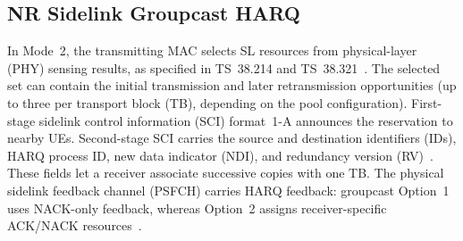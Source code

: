 \documentclass[conference]{IEEEtran}
\begin{document}
\subsection{NR Sidelink Groupcast HARQ}
In Mode~2, the transmitting MAC selects SL resources from physical-layer (PHY) sensing results, as
specified in TS~38.214 and TS~38.321~\cite{3gpp_ts38214,3gpp_ts38321}. The selected set can contain the
initial transmission and later retransmission opportunities (up to three per transport block (TB),
depending on the pool configuration). First-stage sidelink control information (SCI) format~1-A
announces the reservation to nearby UEs. Second-stage SCI carries the source and destination identifiers
(IDs), HARQ process ID, new data indicator (NDI), and redundancy version (RV)~\cite{3gpp_ts38212}. These
fields let a receiver associate successive copies with one TB. The physical sidelink feedback channel
(PSFCH) carries HARQ feedback: groupcast Option~1 uses NACK-only feedback, whereas Option~2 assigns
receiver-specific ACK/NACK resources~\cite{3gpp_ts38213}.
\end{document}
